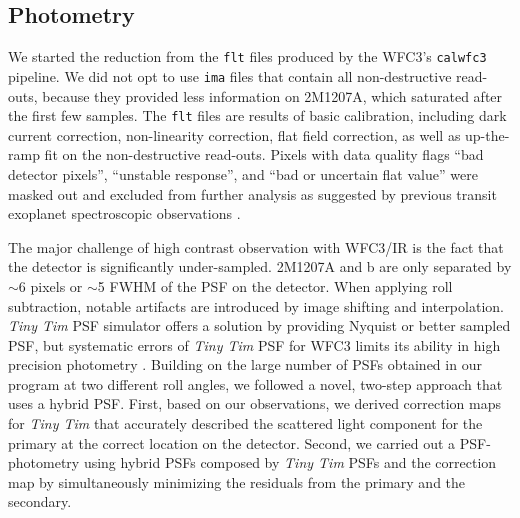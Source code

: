 \documentclass[apj]{emulateapj}
\newcommand{\ima}{\texttt{ima} files }
\newcommand{\flt}{\texttt{flt} files }
\newcommand{\tinytim}{\textit{Tiny Tim}}
\begin{document}
\subsection{Photometry}

We started the reduction from the \flt{} produced by the WFC3's
\texttt{calwfc3} pipeline. We did not opt to use \ima{} that contain
all non-destructive read-outs, because they provided less information
on 2M1207A, which saturated after the first few samples.  The \flt{}
are results of basic calibration, including dark current correction,
non-linearity correction, flat field correction, as well as
up-the-ramp fit on the non-destructive read-outs. 
Pixels with data quality flags ``bad detector pixels'', ``unstable
response'', and ``bad or uncertain flat value'' were masked out and
excluded from further analysis as suggested by previous transit
exoplanet spectroscopic observations \citep[e.g.][]{Berta2012,
  Kreidberg2014}.


The major challenge of high contrast observation with WFC3/IR is the
fact that the detector is significantly under-sampled.  2M1207A and b
are only separated by $\sim6$ pixels or $\sim$5 FWHM of the PSF on the
detector. When applying roll subtraction, notable artifacts are
introduced by image shifting and interpolation.  \tinytim{} PSF
simulator \citep{Krist1995} offers a solution by providing Nyquist or
better sampled PSF, but systematic errors of \tinytim{} PSF for WFC3
limits its ability in high precision photometry \citep{Biretta2014}.
Building on the large number of PSFs obtained in our program at two
different roll angles, we followed a novel, two-step approach that
uses a hybrid PSF.  First, based on our observations, we derived
correction maps for \tinytim{} that accurately described the scattered
light component for the primary at the correct location on the
detector. Second, we carried out a PSF-photometry using hybrid PSFs
composed by \tinytim{} PSFs and the correction map by simultaneously
minimizing the residuals from the primary and the secondary.
\end{document}

